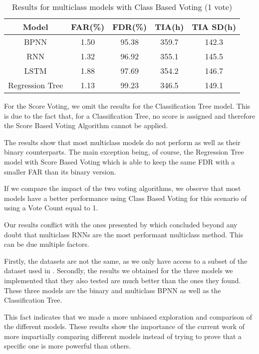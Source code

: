 \begin{table}
  \begin{center}
    \begin{tabular}{|c|c|c|c|c|}
      \hline
    Model & FAR(\%) & FDR(\%) & TIA(h) & TIA SD(h) \\
    \hline
    BPNN & 1.50 & 95.38 & 359.7 & 142.3 \\
    RNN & 1.32 & 96.92 & 355.1 & 145.5 \\
    LSTM & 1.88 & 97.69 & 354.2 & 146.7 \\
    Regression Tree & 1.13 & 99.23 & 346.5 & 149.1 \\
    \hline
    \end{tabular}
    \caption[Results Multiclass Models, Class Voting, 1 vote]{Results for multiclass models with Class Based Voting (1 vote)}
    \label{table:results_multiclass_class_one_vote}
  \end{center}
\end{table}

For the Score Voting, we omit the results for the Classification Tree model.
This is due to the fact that, for a Classification Tree, no score is assigned and therefore the Score Based Voting Algorithm cannot be applied.

The results show that most multiclass models do not perform as well as their binary counterparts.
The main exception being, of course, the Regression Tree model with Score Based Voting which is able to keep the same FDR with a smaller FAR than its binary version.

If we compare the impact of the two voting algorithms, we observe that most models have a better performance using Class Based Voting for this scenario of using a Vote Count equal to 1.

Our results conflict with the ones presented by \cite{Xu16} which concluded beyond any doubt that multiclass RNNs are the most performant multiclass method.
This can be due multiple factors.

Firstly, the datasets are not the same, as we only have access to a subset of the dataset used in \cite{Zhu13}.
Secondly, the results we obtained for the three models we implemented that they also tested are much better than the ones they found.
These three models are the binary and multiclass BPNN as well as the Classification Tree.

This fact indicates that we made a more unbiased exploration and comparison of the different models.
These results show the importance of the current work of more impartially comparing different models instead of trying to prove that a specific one is more powerful than others.

